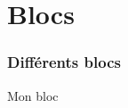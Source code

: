 \documentclass{beamer}
\begin{document}
\section{Blocs}
\label{sec:blocs}

\begin{frame}
\frametitle{Différents blocs}

\vfill

\begin{block}{Mon bloc}
  
\end{block}

\vfill

\begin{definition}[Ma définition]
  
\end{definition}

\vfill

\end{frame}
\end{document}
